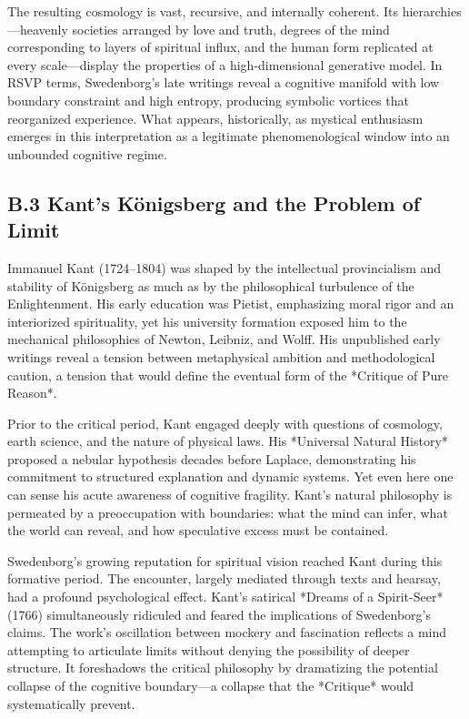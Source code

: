 \documentclass[12pt]{article}
\begin{document}
The resulting cosmology is vast, recursive, and internally coherent. Its 
hierarchies—heavenly societies arranged by love and truth, degrees of the mind 
corresponding to layers of spiritual influx, and the human form replicated at 
every scale—display the properties of a high-dimensional generative model.  
In RSVP terms, Swedenborg’s late writings reveal a cognitive manifold with low 
boundary constraint and high entropy, producing symbolic vortices that 
reorganized experience. What appears, historically, as mystical enthusiasm 
emerges in this interpretation as a legitimate phenomenological window into an 
unbounded cognitive regime.

\subsection*{B.3 Kant’s Königsberg and the Problem of Limit}

Immanuel Kant (1724–1804) was shaped by the intellectual provincialism and 
stability of Königsberg as much as by the philosophical turbulence of the 
Enlightenment. His early education was Pietist, emphasizing moral rigor and an 
interiorized spirituality, yet his university formation exposed him to the 
mechanical philosophies of Newton, Leibniz, and Wolff. His unpublished early 
writings reveal a tension between metaphysical ambition and methodological 
caution, a tension that would define the eventual form of the *Critique of Pure 
Reason*.

Prior to the critical period, Kant engaged deeply with questions of cosmology, 
earth science, and the nature of physical laws. His *Universal Natural History* 
proposed a nebular hypothesis decades before Laplace, demonstrating his 
commitment to structured explanation and dynamic systems. Yet even here one can 
sense his acute awareness of cognitive fragility. Kant’s natural philosophy is 
permeated by a preoccupation with boundaries: what the mind can infer, what the 
world can reveal, and how speculative excess must be contained.

Swedenborg’s growing reputation for spiritual vision reached Kant during this 
formative period. The encounter, largely mediated through texts and hearsay, had 
a profound psychological effect. Kant’s satirical *Dreams of a Spirit-Seer* 
(1766) simultaneously ridiculed and feared the implications of Swedenborg’s 
claims. The work’s oscillation between mockery and fascination reflects a mind 
attempting to articulate limits without denying the possibility of deeper 
structure. It foreshadows the critical philosophy by dramatizing the potential 
collapse of the cognitive boundary—a collapse that the *Critique* would 
systematically prevent.
\end{document}
